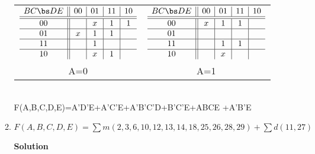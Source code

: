\begin{enumerate}
\begin{enumerate}
\begin{onlysolution}
{                        \begin{tabular}{cc}
                            $
                            \begin{array} {c||c|c|c|c}
                                B C \bs D E   & 00 & 01 & 11 & 10 \\ \hline \hline
                                00        &    & x  & 1  & 1  \\ \hline
                                01        & x  & 1  & 1  &    \\ \hline
                                11        &    & 1  &    &    \\ \hline
                                10        &    & x  & 1  &    \\
                            \end{array}$ &
                            $
                            \begin{array} {c||c|c|c|c}
                                B C \bs D E   & 00 & 01 & 11 & 10 \\ \hline \hline
                                00        & x  & 1  & 1  &    \\ \hline
                                01        &    &    &    &    \\ \hline
                                11        &    & 1  & 1  &    \\ \hline
                                10        &    & x  &    &    \\
                            \end{array}$ \\
                            A=0 & A=1 \\
                        \end{tabular} \\
                        F(A,B,C,D,E)=A'D'E+A'C'E+A'B'C'D+B'C'E+ABCE +A'B'E
                    }
                \end{onlysolution}

            \item $F(A,B,C,D,E)=\sum m(2,3,6,10,12,13,14,18,25,26,28,29)+\sum d(11,27)$

                \begin{onlysolution}  \textbf{Solution} \itshape{

}
\end{onlysolution}
\end{enumerate}
\end{enumerate}
